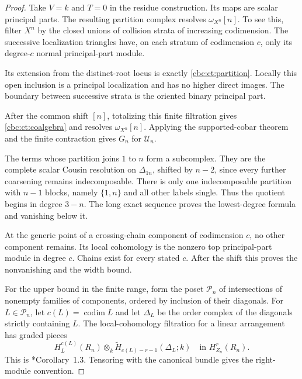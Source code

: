 \begin{proof}
Take $V=k$ and $T=0$ in the residue construction. Its maps
are scalar principal parts. The resulting partition complex
resolves $\omega_{X^n}[n]$. To see this, filter $X^n$ by
the closed unions of collision strata of increasing codimension.
The successive localization triangles have, on each stratum
of codimension $c$, only its degree-$c$ normal principal-part
module.

Its extension from the distinct-root locus is exactly
\eqref{cbc:ct:partition}. Locally this open inclusion is a
principal localization and has no higher direct images. The
boundary between successive strata is the oriented binary
principal part.

After the common shift $[n]$, totalizing this
finite filtration gives \eqref{cbc:ct:coalgebra} and resolves
$\omega_{X^n}[n]$. Applying the supported-cobar theorem and
the finite contraction gives $G_n$ for $\mathcal U_n$.

The terms whose partition joins $1$ to $n$ form a subcomplex.
They are the complete scalar Cousin resolution on $\Delta_{1n}$,
shifted by $n-2$, since every further coarsening remains
indecomposable. There is only one indecomposable partition
with $n-1$ blocks, namely $\{1,n\}$ and all other labels
single. Thus the quotient begins in degree $3-n$. The long
exact sequence proves the lowest-degree formula and vanishing
below it.

At the generic point of a crossing-chain component of
codimension $c$, no other component remains. Its local
cohomology is the nonzero top principal-part module in degree
$c$. Chains exist for every stated $c$. After the shift this
proves the nonvanishing and the width bound.

For the upper bound in the finite range, form the poset
$\mathcal P_n$ of intersections of nonempty families of
components, ordered by inclusion of their diagonals. For
$L\in\mathcal P_n$, let $c(L)=\operatorname{codim}L$ and
let $\Delta_L$ be the order complex of the diagonals strictly
containing $L$. The local-cohomology filtration for a linear
arrangement has graded pieces
\begin{equation}\label{cbc:ct:arrangement-filtration}
 H^{c(L)}_L(R_n)\otimes_k
          \widetilde H_{c(L)-r-1}(\Delta_L;k)
          \quad\text{in }H^r_{Z_n}(R_n).
\end{equation}
This is \cite{AMGLZ2003}*{Corollary~1.3}. Tensoring with
the canonical bundle gives the right-module convention.


\end{proof}
